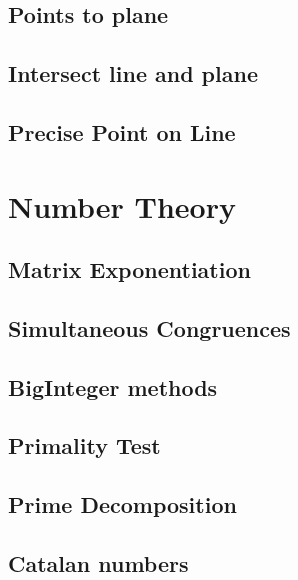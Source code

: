 \documentclass[10pt]{article}
\begin{document}
		\subsection{Points to plane}
		
		
		\subsection{Intersect line and plane}
		
		
		\newpage
		\subsection{Precise Point on Line}
		
	
	\newpage	
	\section{Number Theory}
		\subsection{Matrix Exponentiation}
		
		\newpage
		
		\subsection{Simultaneous Congruences}
		
		
		\subsection{BigInteger methods}
		
		\newpage
		
	
		\subsection{Primality Test}
		
		
		\subsection{Prime Decomposition}
		
		
		\subsection{Catalan numbers}
		
		\newpage
		
\end{document}
